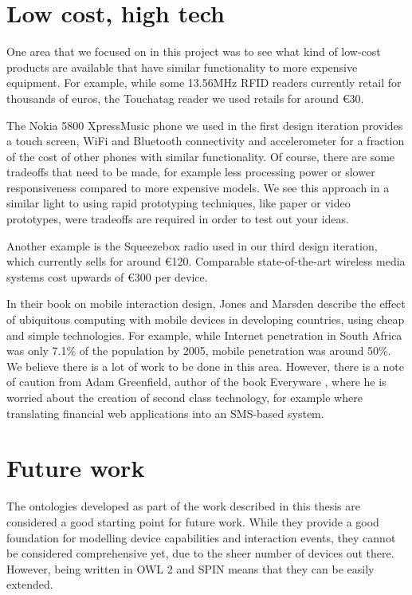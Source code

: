 \section{Low cost, high tech}

One area that we focused on in this project was to see what kind of low-cost products are available that have similar functionality to more expensive equipment. For example, while some 13.56MHz \ac{RFID} readers currently retail for thousands of euros, the Touchatag reader we used retails for around \euro 30.  

The Nokia 5800 XpressMusic phone we used in the first design iteration provides a touch screen, WiFi and Bluetooth connectivity and accelerometer for a fraction of the cost of other phones with similar functionality. Of course, there are some tradeoffs that need to be made, for example less processing power or slower responsiveness compared to more expensive models. We see this approach in a similar light to using rapid prototyping techniques, like paper or video prototypes, were tradeoffs are required in order to test out your ideas.

Another example is the Squeezebox radio used in our third design iteration, which currently sells for around \euro 120. Comparable state-of-the-art wireless media systems cost upwards of \euro 300 per device.

In their book on mobile interaction design, Jones and Marsden \cite{Jones2006} describe the effect of ubiquitous computing with mobile devices in developing countries, using cheap and simple technologies.  For example, while Internet penetration in South Africa was only 7.1\% of the population by 2005, mobile penetration was around 50\%. We believe there is a lot of work to be done in this area. However, there is a note of caution from Adam Greenfield, author of the book Everyware \cite{Greenfield2006}, where he is worried about the creation of second class technology, for example where translating financial web applications into an SMS-based system.


\section{Future work}

The ontologies developed as part of the work described in this thesis are considered a good starting point for future work. While they provide a good foundation for modelling device capabilities and interaction events, they cannot be considered comprehensive yet, due to the sheer number of devices out there. However, being written in \ac{OWL} 2 and \ac{SPIN} means that they can be easily extended.

